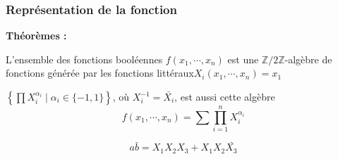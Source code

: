 \documentclass[handout]{beamer}
\newcommand{\ZZ}{{\mathbb{Z}/2\mathbb{Z}}}
\newcommand{\ensemble}[1]{{\left\lbrace{} #1 \right\rbrace{}}}
\begin{document}
\begin{frame}
  \frametitle{Représentation de la fonction}
  
  \textbf{Théorèmes :}
  \begin{mdframed}
  L'ensemble des fonctions booléennes $f(x_1, \cdots, x_n)$ est une $\ZZ$-algèbre de fonctions générée par les fonctions \og littéraux\fg $X_i (x_1, \cdots, x_n) = x_1$
  \end{mdframed} 
  
  \begin{mdframed}
  $\ensemble{\prod X_i^{\alpha_i} \mid \alpha_i\in \{-1,1\}}$, où $X_i^{-1} = \bar{X_i}$, est aussi cette algèbre
  \[ f(x_1,\cdots, x_n) = \sum \prod_{i=1}^n X_i^{\alpha_i} \]
  \end{mdframed}
  
  
  \begin{figure}[p]
  \begin{tikzpicture}[scale=1.5]
  
  \end{tikzpicture}
  \end{figure}
  
  \[ a\bar{b} = X_1 X_2 X_3 + X_1 X_2 \bar{X_3} \]
  \vfill\null
  

\end{frame}
\end{document}
